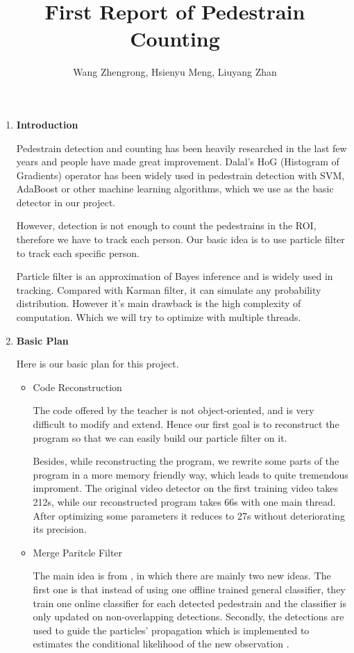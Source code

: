 \documentclass[a4paper]{article}
\title{First Report of Pedestrain Counting}
\author{Wang Zhengrong, Hsienyu Meng, Liuyang Zhan}
\begin{document}
\maketitle
\begin{enumerate}
\item \textbf{Introduction}

Pedestrain detection and counting has been heavily researched in the last few years and people have made great improvement. Dalal's HoG (Histogram of Gradients) operator has been widely used in pedestrain detection with SVM, AdaBoost or other machine learning algorithms, which we use as the basic detector in our project.

However, detection is not enough to count the pedestrains in the ROI, therefore we have to track each person. Our basic idea is to use particle filter to track each specific person.

Particle filter is an approximation of Bayes inference and is widely used in tracking. Compared with Karman filter, it can simulate any probability distribution. However it's main drawback is the high complexity of computation. Which we will try to optimize with multiple threads.

\item \textbf{Basic Plan}

Here is our basic plan for this project.

\begin{itemize}
\item Code Reconstruction

The code offered by the teacher is not object-oriented, and is very difficult to modify and extend. Hence our first goal is to reconstruct the program so that we can easily build our particle filter on it.

Besides, while reconstructing the program, we rewrite some parts of the program in a more memory friendly way, which leads to quite tremendous improment. The original video detector on the first training video takes 212s, while our reconstructed program takes 66s with one main thread. After optimizing some parameters it reduces to 27s without deteriorating its precision.

\item Merge Paritcle Filter

The main idea is from \cite{eth_biwi_00633}, in which there are mainly two new ideas. The first one is that instead of using one offline trained general classifier, they train one online classifier for each detected pedestrain and the classifier is only updated on non-overlapping detections. Secondly, the detections are used to guide the particles' propagation which is implemented to estimates the conditional likelihood of the new observation .


\end{itemize}
\end{enumerate}
\end{document}
